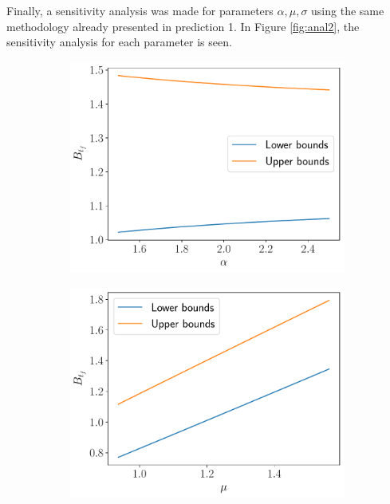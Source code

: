\documentclass[11pt]{article}
\theoremstyle{definition}
\theoremstyle{remark}
\theoremstyle{remark}
\begin{document}
Finally, a sensitivity analysis was made for parameters
$\alpha, \mu, \sigma$ using the same methodology already presented in
prediction 1. In Figure \ref{fig:anal2}, the sensitivity analysis for
each parameter is seen.

\begin{figure}
  \centering
  \begin{subfigure}[b]{0.45\textwidth}
      \centering
      \includegraphics[scale=0.45]{alpha_sens}
      \caption{}
  \end{subfigure}
  \begin{subfigure}[b]{0.45\textwidth}
      \centering
      \includegraphics[scale=0.45]{mu_sens}
      \caption{}

\end{subfigure}
\end{figure}
\end{document}
